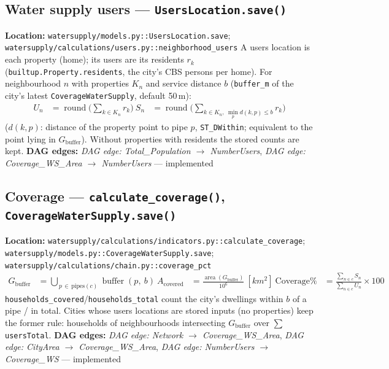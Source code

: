 \documentclass[11pt]{article}
\newcommand{\code}[1]{\texttt{#1}}
\newcommand{\dagedge}[1]{\textit{DAG edge: #1}}
\newcommand{\statusdone}{\textcolor{green!50!black}{implemented}}
\begin{document}
\subsection{Water supply users --- \code{UsersLocation.save()}}
\textbf{Location:} \code{watersupply/models.py::UsersLocation.save}; \code{watersupply/calculations/users.py::neighborhood\_users}
A users location is each property (home); its users are its residents $r_k$ (\code{builtup.Property.residents}, the city's CBS persons per home). For neighbourhood $n$ with properties $K_n$ and service distance $b$ (\code{buffer\_m} of the city's latest \code{CoverageWaterSupply}, default 50\,\si{m}):
\begin{align}
  U_n &= \operatorname{round}\Big(\sum_{k \in K_n} r_k\Big) \
  S_n &= \operatorname{round}\Big(\sum_{k \in K_n,\ \min_{p} d(k, p) \le b} r_k\Big)
\end{align}
($d(k,p)$: distance of the property point to pipe $p$, \code{ST\_DWithin}; equivalent to the point lying in $G_{\text{buffer}}$). Without properties with residents the stored counts are kept. \textbf{DAG edges:} \dagedge{Total\_Population $\rightarrow$ NumberUsers}, \dagedge{Coverage\_WS\_Area $\rightarrow$ NumberUsers} --- \statusdone{}

\subsection{Coverage --- \code{calculate\_coverage()}, \code{CoverageWaterSupply.save()}}
\textbf{Location:} \code{watersupply/calculations/indicators.py::calculate\_coverage}; \code{watersupply/models.py::CoverageWaterSupply.save}; \code{watersupply/calculations/chain.py::coverage\_pct}
\begin{align}
  G_{\text{buffer}} &= \bigcup_{\,p\, \in\, \text{pipes}(c)} \operatorname{buffer}(p,\ b) \
  A_{\text{covered}} &= \frac{\operatorname{area}(G_{\text{buffer}})}{10^6}\ [\si{km^2}] \
  \text{Coverage\%} &= \frac{\sum_{n \in c} S_n}{\sum_{n \in c} U_n} \times 100
\end{align}
\code{households\_covered}/\code{households\_total} count the city's dwellings within $b$ of a pipe / in total. Cities whose users locations are stored inputs (no properties) keep the former rule: households of neighbourhoods intersecting $G_{\text{buffer}}$ over $\sum$ \code{usersTotal}. \textbf{DAG edges:} \dagedge{Network $\rightarrow$ Coverage\_WS\_Area}, \dagedge{CityArea $\rightarrow$ Coverage\_WS\_Area}, \dagedge{NumberUsers $\rightarrow$ Coverage\_WS} --- \statusdone{}
\end{document}
